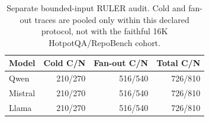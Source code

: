 \begin{table}[t]
\centering\small
\caption{Separate bounded-input RULER audit. Cold and fan-out traces are pooled only within this declared protocol, not with the faithful 16K HotpotQA/RepoBench cohort.}
\label{tab:s-ruler}
\begin{tabular}{@{}lrrr@{}}
\toprule
Model & Cold C/N & Fan-out C/N & Total C/N\\
\midrule
Qwen & 210/270 & 516/540 & 726/810\\
Mistral & 210/270 & 516/540 & 726/810\\
Llama & 210/270 & 516/540 & 726/810\\
\bottomrule
\end{tabular}
\end{table}
